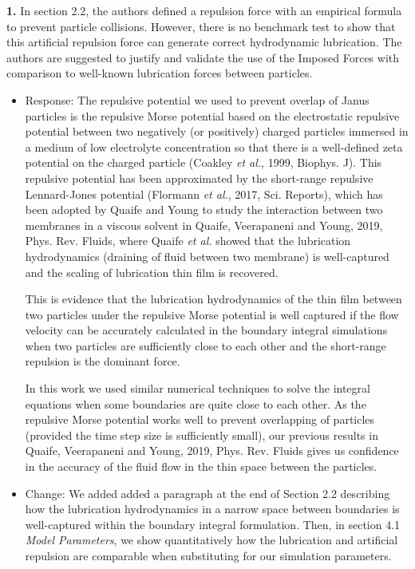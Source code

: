 \documentclass[11pt]{article}
\newcommand{\comment}[1]{{\color{blue} #1}}
\begin{document}
\noindent
\comment{{\bf 1.} In section 2.2, the authors defined a repulsion force with an
empirical formula to prevent particle collisions. However, there is no
benchmark test to show that this artificial repulsion force can generate
correct hydrodynamic lubrication. The authors are suggested to justify
and validate the use of the Imposed Forces with comparison to well-known
lubrication forces between particles.}
\begin{itemize}
  \item Response: The repulsive potential we used to prevent overlap of
    Janus particles is the repulsive Morse potential based on the
    electrostatic repulsive potential between two negatively (or
    positively) charged particles immersed in a medium of low
    electrolyte concentration so that there is a well-defined zeta
    potential on the charged particle (Coakley {\sl et al.}, 1999,
    Biophys. J). This repulsive potential has been approximated by the
    short-range repulsive Lennard-Jones potential (Flormann {\sl et
    al.}, 2017, Sci. Reports), which has been adopted by Quaife and
    Young to study the interaction between two membranes in a viscous
    solvent in Quaife, Veerapaneni and Young, 2019, Phys. Rev. Fluids,
    where Quaife {\sl et al.} showed that the lubrication hydrodynamics
    (draining of fluid between two membrane) is well-captured and the
    scaling of lubrication thin film is recovered. 
  
This is evidence that the lubrication hydrodynamics of the thin film between two particles under the repulsive Morse potential is well captured if the flow velocity can be accurately calculated in the boundary integral simulations when two particles are sufficiently close to each other and the short-range repulsion is the dominant force. 

In this work we used similar numerical techniques to solve the integral equations when some boundaries are quite close to each other. As the repulsive Morse potential works well to prevent overlapping of particles (provided the time step size is sufficiently small), our previous results in Quaife, Veerapaneni and Young, 2019, Phys. Rev. Fluids gives us confidence in the accuracy of the fluid flow in the thin space between the particles.

\item Change: We added added a paragraph at the end of Section 2.2
  describing how the lubrication hydrodynamics in a narrow space between
    boundaries is well-captured within the boundary integral
    formulation. Then, in section 4.1 \textit{Model Parameters}, we
    show quantitatively how the lubrication and artificial repulsion are
    comparable when substituting for our simulation parameters.
\end{itemize}
\end{document}
